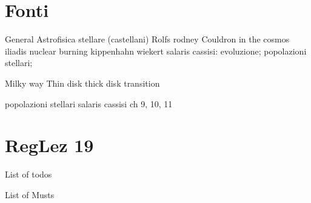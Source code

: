 \section{Fonti}

\begin{wordonframe}{General}
Astrofisica stellare (castellani)
Rolfs rodney Couldron in the cosmos
iliadis nuclear burning
kippenhahn wiekert
salaris cassisi: evoluzione; popolazioni stellari;
\end{wordonframe}

\begin{wordonframe}{Milky way}
Thin disk thick disk transition
\end{wordonframe}

\begin{wordonframe}{popolazioni stellari}
salaris cassisi ch 9, 10, 11
\end{wordonframe}

\section{RegLez 19}

\begin{frame}[allowframebreaks]{List of todos}
\listoftodos
\end{frame}


\begin{frame}[allowframebreaks]{List of Musts}
	\listofmusts
\end{frame}

